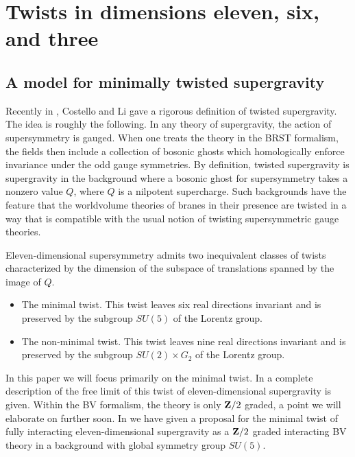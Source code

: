 \documentclass[11pt]{amsart}%
\begin{document}
%

\section{Twists in dimensions eleven, six, and three}

\subsection{A model for minimally twisted supergravity}


Recently in \cite{CLsugra}, Costello and Li gave a rigorous definition of twisted supergravity.
The idea is roughly the following.
In any theory of supergravity, the action of supersymmetry is gauged. 
When one treats the theory in the BRST formalism, the fields then include a collection of bosonic ghosts which homologically enforce invariance under the odd gauge symmetries.
By definition, twisted supergravity is supergravity in the background where a bosonic ghost for supersymmetry takes a nonzero value $Q$, where $Q$ is a nilpotent supercharge. 
Such backgrounds have the feature that the worldvolume theories of branes in their presence are twisted in a way that is compatible with the usual notion of twisting supersymmetric gauge theories.

Eleven-dimensional supersymmetry admits two inequivalent classes of twists characterized by the dimension of the subspace of translations spanned by the image of $Q$.
\begin{itemize}
\item 
The minimal twist. 
This twist leaves six real directions invariant and is preserved by the subgroup $SU(5)$ of the Lorentz group. 
\item 
The non-minimal twist. 
This twist leaves nine real directions invariant and is preserved by the subgroup $SU(2) \times G_2$ of the Lorentz group. 
\end{itemize}

In this paper we will focus primarily on the minimal twist. 
In \cite{SWspinor} a complete description of the free limit of this twist of eleven-dimensional supergravity is given.
Within the BV formalism, the theory is only $\mathbf{Z}/2$ graded, a point we will elaborate on further soon. 
In \cite{RSW} we have given a proposal for the minimal twist of fully interacting eleven-dimensional supergravity as a $\mathbf{Z}/2$ graded interacting BV theory in a background with global symmetry group $SU(5)$.
\end{document}
